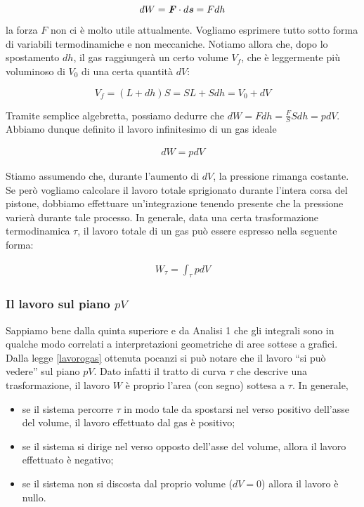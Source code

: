 \[ dW = \textbf{\textit{F}} \cdot d\textbf{\textit{s}} = Fdh \]

\noindent la forza $F$ non ci è molto utile attualmente. Vogliamo esprimere
tutto sotto forma di variabili termodinamiche e non meccaniche. Notiamo
allora che, dopo lo spostamento $dh$, il gas raggiungerà un certo volume
$V_f$, che è leggermente più voluminoso di $V_0$ di una certa quantità $dV$:

\[ V_f = (L + dh)S = SL + Sdh = V_0 + dV \]

\noindent Tramite semplice algebretta, possiamo dedurre che
$dW = Fdh = \frac{F}{S}Sdh = pdV$. Abbiamo dunque definito
il lavoro infinitesimo di un gas ideale

\begin{align}
    dW = pdV
\end{align}

Stiamo assumendo che, durante l'aumento di $dV$, la pressione
rimanga costante. Se però vogliamo calcolare il lavoro totale
sprigionato durante l'intera corsa del pistone, dobbiamo effettuare
un'integrazione tenendo presente che la pressione varierà durante
tale processo. In generale, data una certa trasformazione termodinamica
$\tau$, il lavoro totale di un gas può essere espresso nella
seguente forma:

\begin{align}
    W_\tau = \int_\tau pdV\label{lavorogas}
\end{align}

\subsubsection*{Il lavoro sul piano $pV$}
Sappiamo bene dalla quinta superiore e da Analisi 1 che gli integrali
sono in qualche modo correlati a interpretazioni geometriche di aree
sottese a grafici. Dalla legge \ref{lavorogas} ottenuta pocanzi si può
notare che il lavoro ``si può vedere'' sul piano $pV$. Dato infatti
il tratto di curva $\tau$ che descrive una trasformazione, il lavoro
$W$ è proprio l'area (con segno) sottesa a $\tau$. In generale,

\begin{itemize}
    \item se il sistema percorre $\tau$ in modo tale da spostarsi nel verso positivo
    dell'asse del volume, il lavoro effettuato dal gas è positivo;

    \item se il sistema si dirige nel verso opposto dell'asse del volume,
    allora il lavoro effettuato è negativo;

    \item se il sistema non si discosta dal proprio volume ($dV = 0$)
    allora il lavoro è nullo.
\end{itemize}

